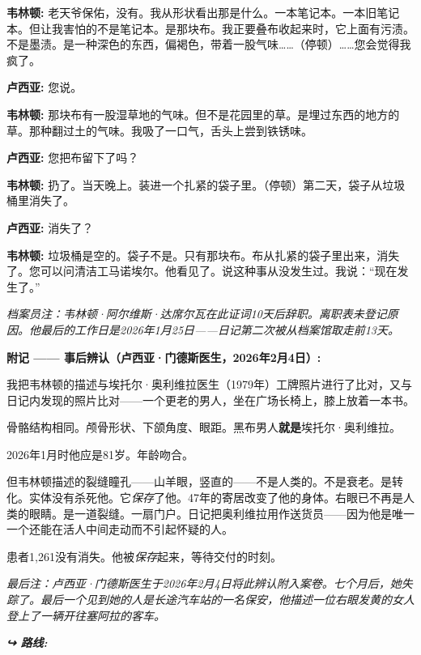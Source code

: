\noindent \textbf{韦林顿:} 老天爷保佑，没有。我从形状看出那是什么。一本笔记本。一本旧笔记本。但让我害怕的不是笔记本。是那块布。我正要叠布收起来时，它上面有污渍。不是墨渍。是一种深色的东西，偏褐色，带着一股气味……（停顿）……您会觉得我疯了。

\noindent \textbf{卢西亚:} 您说。

\noindent \textbf{韦林顿:} 那块布有一股湿草地的气味。但不是花园里的草。是埋过东西的地方的草。那种翻过土的气味。我吸了一口气，舌头上尝到铁锈味。

\noindent \textbf{卢西亚:} 您把布留下了吗？

\noindent \textbf{韦林顿:} 扔了。当天晚上。装进一个扎紧的袋子里。（停顿）第二天，袋子从垃圾桶里消失了。

\noindent \textbf{卢西亚:} 消失了？

\noindent \textbf{韦林顿:} 垃圾桶是空的。袋子不是。只有那块布。布从扎紧的袋子里出来，消失了。您可以问清洁工马诺埃尔。他看见了。说这种事从没发生过。我说：\textquotedblleft{现在发生了。\textquotedblright{}}

\noindent \textit{档案员注：韦林顿·阿尔维斯·达席尔瓦在此证词10天后辞职。离职表未登记原因。他最后的工作日是2026年1月25日——日记第二次被从档案馆取走前13天。}

\noindent \textbf{附记 —— 事后辨认（卢西亚·门德斯医生，2026年2月4日）:}

\noindent 我把韦林顿的描述与埃托尔·奥利维拉医生（1979年）工牌照片进行了比对，又与日记内发现的照片比对——一个更老的男人，坐在广场长椅上，膝上放着一本书。

\noindent 骨骼结构相同。颅骨形状、下颌角度、眼距。黑布男人\textbf{就是}埃托尔·奥利维拉。

\noindent 2026年1月时他应是81岁。年龄吻合。

\noindent 但韦林顿描述的裂缝瞳孔——山羊眼，竖直的——不是人类的。不是衰老。是转化。实体没有杀死他。它\textit{保存}了他。47年的寄居改变了他的身体。右眼已不再是人类的眼睛。是一道裂缝。一扇门户。日记把奥利维拉用作送货员——因为他是唯一一个还能在活人中间走动而不引起怀疑的人。

\noindent 患者1,261没有消失。他被\textit{保存}起来，等待交付的时刻。

\noindent \textit{最后注：卢西亚·门德斯医生于2026年2月4日将此辨认附入案卷。七个月后，她失踪了。最后一个见到她的人是长途汽车站的一名保安，他描述一位右眼发黄的女人登上了一辆开往塞阿拉的客车。}

\vspace{0.5em}
\noindent\textit{\textbf{↪ 路线:}  \rotasep {} \rotasep {}}
